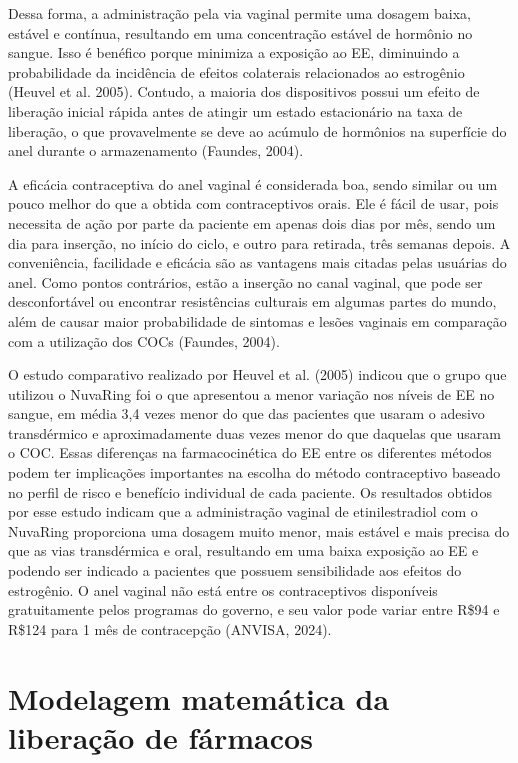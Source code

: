 Dessa forma, a administração pela via vaginal permite uma dosagem baixa, estável e contínua, resultando em uma concentração estável de hormônio no sangue. Isso é benéfico porque minimiza a exposição ao EE, diminuindo a probabilidade da incidência de efeitos colaterais relacionados ao estrogênio (Heuvel et al. 2005). Contudo, a maioria dos dispositivos possui um efeito de liberação inicial rápida antes de atingir um estado estacionário na taxa de liberação, o que provavelmente se deve ao acúmulo de hormônios na superfície do anel durante o armazenamento (Faundes, 2004).

A eficácia contraceptiva do anel vaginal é considerada boa, sendo similar ou um pouco melhor do que a obtida com contraceptivos orais. Ele é fácil de usar, pois necessita de ação por parte da paciente em apenas dois dias por mês, sendo um dia para inserção, no início do ciclo, e outro para retirada, três semanas depois. A conveniência, facilidade e eficácia são as vantagens mais citadas pelas usuárias do anel. Como pontos contrários, estão a inserção no canal vaginal, que pode ser desconfortável ou encontrar resistências culturais em algumas partes do mundo,  além de causar maior probabilidade de sintomas e lesões vaginais em comparação com a utilização dos COCs (Faundes, 2004). 

O estudo comparativo realizado por Heuvel et al. (2005) indicou que o grupo que utilizou o NuvaRing foi o que apresentou a menor variação nos níveis de EE no sangue, em média 3,4 vezes menor do que das pacientes que usaram o adesivo transdérmico e aproximadamente duas vezes menor do que daquelas que usaram o COC. Essas diferenças na farmacocinética do EE entre os diferentes métodos podem ter implicações importantes na escolha do método contraceptivo baseado no perfil de risco e benefício individual de cada paciente.  Os resultados obtidos por esse estudo indicam que a administração vaginal de etinilestradiol com o NuvaRing proporciona uma dosagem muito menor, mais estável e mais precisa do que as vias transdérmica e oral, resultando em uma baixa exposição ao EE e podendo ser indicado a pacientes que possuem sensibilidade aos efeitos do estrogênio. O anel vaginal não está entre os contraceptivos disponíveis gratuitamente pelos programas do governo, e seu valor pode variar entre R\$94 e R\$124 para 1 mês de contracepção (ANVISA, 2024).

\section{Modelagem matemática da liberação de fármacos}

